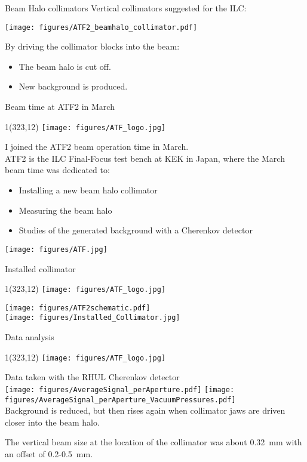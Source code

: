\documentclass[xcolor={dvipsnames}]{beamer}
\newcommand{\ATFlogo}{
  \setlength{\TPHorizModule}{1pt}
  \setlength{\TPVertModule}{1pt}
  \begin{textblock}{1}(323,12)
   \texttt{[image: figures/ATF\_logo.jpg]}
  \end{textblock}
}
\begin{document}
\begin{frame}{Beam Halo collimators}
Vertical collimators suggested for the ILC:\\
 \begin{center}
\texttt{[image: figures/ATF2\_beamhalo\_collimator.pdf]}
\end{center}
By driving the collimator blocks into the beam:\\
\begin{itemize}
 \item The beam halo is cut off.
 \item New background is produced.
\end{itemize}

\end{frame}

\begin{frame}{Beam time at ATF2 in March}
\ATFlogo
I joined the ATF2 beam operation time in March.\\
ATF2 is the ILC Final-Focus test bench at KEK in Japan, where the March beam time was dedicated to:
\begin{itemize}
\item Installing a new beam halo collimator
\item Measuring the beam halo
\item Studies of the generated background with a Cherenkov detector
\end{itemize}
\begin{center}
 	\texttt{[image: figures/ATF.jpg]}
\end{center}
\end{frame}

\begin{frame}{Installed collimator}
\ATFlogo

\begin{center}
\texttt{[image: figures/ATF2schematic.pdf]}\\
 \texttt{[image: figures/Installed\_Collimator.jpg]}
\end{center}
\end{frame}

\begin{frame}{Data analysis}
\ATFlogo
Data taken with the RHUL Cherenkov detector\\
\vspace*{0.4cm}
 \texttt{[image: figures/AverageSignal\_perAperture.pdf]}
  \texttt{[image: figures/AverageSignal\_perAperture\_VacuumPressures.pdf]}\\
Background is reduced, but then rises again when collimator jaws are driven closer into the beam halo.\\
\begin{block}{}
The vertical beam size at the location of the collimator was about \SI{0.32}{mm} with an offset of 0.2-\SI{0.5}{mm}.
\end{block}
\end{frame}
\end{document}
